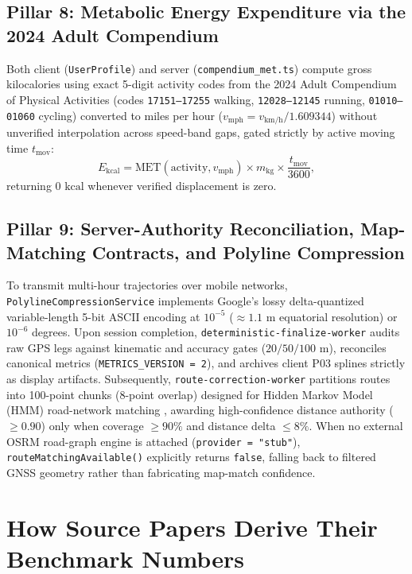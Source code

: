 \documentclass[journal]{IEEEtran}
\begin{document}
\subsection{Pillar 8: Metabolic Energy Expenditure via the 2024 Adult Compendium}
Both client (\texttt{UserProfile}) and server (\texttt{compendium\_met.ts}) compute gross kilocalories using exact 5-digit activity codes from the 2024 Adult Compendium of Physical Activities \cite{herrmann2024compendium} (codes \texttt{17151--17255} walking, \texttt{12028--12145} running, \texttt{01010--01060} cycling) converted to miles per hour ($v_{\text{mph}} = v_{\text{km/h}}/1.609344$) without unverified interpolation across speed-band gaps, gated strictly by active moving time $t_{\text{mov}}$:
\begin{equation}
  E_{\text{kcal}} = \mathrm{MET}(\text{activity}, v_{\text{mph}}) \times m_{\text{kg}} \times \frac{t_{\text{mov}}}{3600},
  \label{eq:met}
\end{equation}
returning $0\text{ kcal}$ whenever verified displacement is zero.

\subsection{Pillar 9: Server-Authority Reconciliation, Map-Matching Contracts, and Polyline Compression}
To transmit multi-hour trajectories over mobile networks, \texttt{PolylineCompressionService} implements Google's lossy delta-quantized variable-length 5-bit ASCII encoding at $10^{-5}$ ($\approx 1.1\text{ m}$ equatorial resolution) or $10^{-6}$ degrees. Upon session completion, \texttt{deterministic-finalize-worker} audits raw GPS legs against kinematic and accuracy gates ($20/50/100\text{ m}$), reconciles canonical metrics (\texttt{METRICS\_VERSION = 2}), and archives client P03 splines strictly as display artifacts. Subsequently, \texttt{route-correction-worker} partitions routes into 100-point chunks (8-point overlap) designed for Hidden Markov Model (HMM) road-network matching \cite{newson2009hidden}, awarding high-confidence distance authority ($\ge 0.90$) only when coverage $\ge 90\%$ and distance delta $\le 8\%$. When no external OSRM road-graph engine is attached (\texttt{provider = "stub"}), \texttt{routeMatchingAvailable()} explicitly returns \texttt{false}, falling back to filtered GNSS geometry rather than fabricating map-match confidence.

\section{How Source Papers Derive Their Benchmark Numbers}
\end{document}
